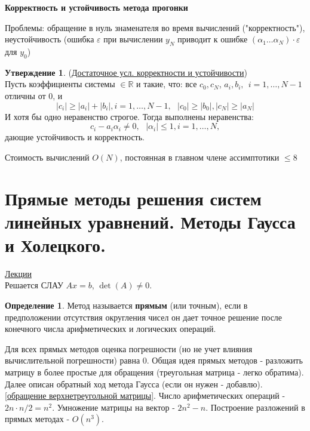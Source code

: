 \documentclass[specialist, subf, href, colorlinks=true, 12pt, times, mtpro, final]{disser}
\theoremstyle{definition}
\newtheorem{defn}{Определение}[section]
\newtheorem{state}{Утверждение}[section]
\begin{document}
    \begin{center}
    {\bf Корректность и устойчивость метода прогонки}
    \end{center} 

    Проблемы: обращение в нуль знаменателя во время вычислений ("корректность"), неустойчивость (ошибка $\varepsilon$ при вычислении $y_N$ приводит к ошибке $(\alpha_1 \dots \alpha_N)\cdot \varepsilon$ для $y_0$) 

    \begin{state} (\hyperlink {lects.50}{Достаточное усл. корректности и устойчивости})\\
    Пусть коэффициенты системы $\in \mathbb{R}$ и такие, что: все $c_0, c_N$, $a_i, b_i, \ \ i = 1, \dots, N-1$ отличны от 0, и
    $$|c_i| \ge |a_i|+|b_i|, i = 1, \dots, N-1, \ \ \ |c_0| \ge |b_0|, |c_N| \ge |a_N|$$
    И хотя бы одно неравенство строгое. Тогда выполнены неравенства:
    $$c_i - a_i\alpha_i \ne 0, \ \ \ |\alpha_i| \le 1, i = 1, \dots, N,$$
    дающие устойчивость и корректность.
    \end{state}
    
    Стоимость вычислений $O(N)$, постоянная в главном члене ассимптотики $\le 8$

\section {Прямые методы решения систем линейных уравнений. Методы Гаусса и Холецкого.}
    \hyperlink {lects.51}{Лекции}\\
    Решается СЛАУ $Ax = b$, $\det(A) \ne 0$.
    \begin{defn}
    Метод называется \textbf{прямым} (или точным), если в предположении отсутствия округления чисел он дает точное решение после конечного числа арифметических и логических операций.
    \end{defn}
    
    Для всех прямых методов оценка погрешности (но не учет влияния вычислительной погрешности) равна 0. Общая идея прямых методов - разложить матрицу в более простые для обращения (треугольная матрица        - легко обратима). Далее описан обратный ход метода Гаусса (если он нужен - добавлю). \hyperlink {lects.51}{[обращение верхнетреугольной матрицы]}. Число арифметических операций - $2n \cdot n/2 =         n^2$. Умножение матрицы на вектор - $2n^2 - n$. Построение разложений в прямых методах - $O(n^3)$. 
    
\end{document}
